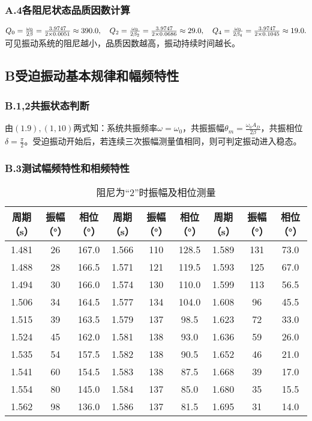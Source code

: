 \documentclass{ctexart}
\begin{document}
\subsubsection*{A.4\quad 各阻尼状态品质因数计算}
  $Q_0=\frac{\omega_0}{2\beta}=\frac{3.9747}{2\times 0.0051}\approx 390.0, \quad
  Q_2=\frac{\omega_0}{2\beta_2}=\frac{3.9747}{2\times 0.0686}\approx 29.0, \quad Q_4=\frac{\omega_0}{2\beta_4}=\frac{3.9747}{2\times 0.1045}\approx 19.0. \notag$\\

可见振动系统的阻尼越小，品质因数越高，振动持续时间越长。

\subsection*{B\quad 受迫振动基本规律和幅频特性}

\subsubsection*{B.1,2\quad 共振状态判断}
由$(1.9),(1,10)$两式知：系统共振频率$\omega=\omega_0$，共振振幅$\theta_m=\frac{\omega_0 A_D}{2\beta}$，共振相位$\delta=\frac{\pi}{2}$。受迫振动开始后，若连续三次振幅测量值相同，则可判定振动进入稳态。


\subsubsection*{B.3\quad 测试幅频特性和相频特性}

\begin{table}[!htbp]
  \centering
  \caption{阻尼为“2”时振幅及相位测量}\vspace{1em} \label{tab:aStrangeTable}%
  \begin{tabular}{ccc|ccc|ccc}
  \toprule
  周期（s）& 振幅（°）& 相位（°）& 周期（s）& 振幅（°）& 相位（°）& 周期（s）& 振幅（°）& 相位（°）\\ 
  \midrule
  1.481& 26& 167.0& 1.566& 110& 128.5& 1.589& 131& 73.0\\
  1.488& 28& 166.5& 1.571& 121& 119.5& 1.593& 125& 67.0\\
  1.494& 30& 166.0& 1.574& 130& 110.0& 1.599& 113& 56.5\\
  1.506& 34& 164.5& 1.577& 134& 104.0& 1.608&  96& 45.5\\
  1.515& 39& 163.5& 1.579& 137&  98.5& 1.623&  72& 33.0\\
  1.524& 45& 162.0& 1.581& 138&  93.0& 1.636&  59& 26.0\\
  1.535& 54& 157.5& 1.582& 138&  90.5& 1.652&  46& 21.0\\
  1.541& 60& 154.5& 1.583& 138&  87.5& 1.668&  39& 17.0\\
  1.554& 80& 145.0& 1.584& 137&  85.0& 1.680&  35& 15.5\\
  1.562& 98& 136.0& 1.586& 137&  81.5& 1.695&  31& 14.0\\
  \bottomrule
  \end{tabular}
  \end{table}
\end{document}
